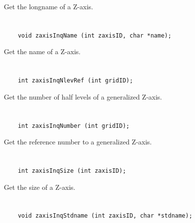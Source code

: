 Get the longname of a Z-axis.


\section*{\tt {}}

\begin{verbatim}
    void zaxisInqName (int zaxisID, char *name);
\end{verbatim}

Get the name of a Z-axis.


\section*{\tt {}}

\begin{verbatim}
    int zaxisInqNlevRef (int gridID);
\end{verbatim}

Get the number of half levels of a generalized Z-axis.


\section*{\tt {}}

\begin{verbatim}
    int zaxisInqNumber (int gridID);
\end{verbatim}

Get the reference number to a generalized Z-axis.


\section*{\tt {}}

\begin{verbatim}
    int zaxisInqSize (int zaxisID);
\end{verbatim}

Get the size of a Z-axis.


\section*{\tt {}}

\begin{verbatim}
    void zaxisInqStdname (int zaxisID, char *stdname);
\end{verbatim}

